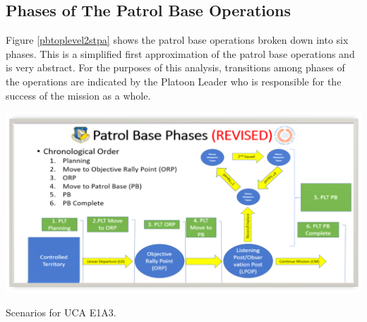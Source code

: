 \documentclass[../../main/main.tex]{subfiles}
\begin{document}
\subsection{Phases of The Patrol Base Operations}
Figure \ref{pbtoplevel2stpa} shows the patrol base operations broken down into six phases.   This is a simplified first approximation of the patrol base operations and is very abstract.  For the purposes of this analysis, transitions among phases of the operations are indicated by the Platoon Leader who is responsible for the success of the mission as a whole.  

\begin{table}[ht!]
\begin{center}
\includegraphics[width=\linewidth]{../figures/pbtoplevel}
\caption{Scenarios for UCA E1A3.}
\label{pbtoplevel2stpa}
\end{center}
\end{table}
\clearpage
\end{document}
